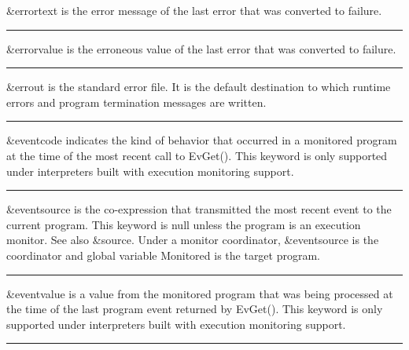 \noindent
{}\textsf{\&errortext} is the error
message of the last error that was converted to failure.

\bigskip\hrule\vspace{0.1cm}

\noindent
\textsf{\&errorvalue} is the erroneous value of the last error that was
converted to failure.

\bigskip\hrule\vspace{0.1cm}

\noindent
{}\textsf{\&errout} is the standard
error file. It is the default destination to which runtime errors and
program termination messages are written.

\bigskip\hrule\vspace{0.1cm}

\noindent
{}\textsf{\&eventcode} indicates the
kind of behavior that occurred in a monitored program at the time of
the most recent call to \textsf{EvGet()}. This keyword is only
supported under interpreters built with execution monitoring support.

\bigskip\hrule\vspace{0.1cm}

\noindent
\textsf{\&eventsource} is the co-expression that transmitted the most
recent event to the current program. This keyword is null unless the
program is an execution monitor. See also \textsf{\&source}. Under a
monitor coordinator, \textsf{\&eventsource} is the coordinator and
global variable Monitored is the target program.

\bigskip\hrule\vspace{0.1cm}

\noindent
{}\textsf{\&eventvalue} is a value
from the monitored program that was being processed at the time of the
last program event returned by \textsf{EvGet()}. This keyword is only
supported under interpreters built with execution monitoring support.

\bigskip\hrule\vspace{0.1cm}

